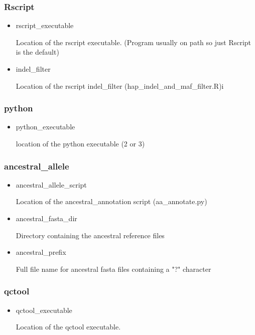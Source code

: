 \documentclass[a4paper,10pt]{article}
\begin{document}
\subsubsection{Rscript}
\begin{itemize}
\item rscript\_executable

Location of the rscript executable. (Program usually on path so just Rscript is the default)
\item indel\_filter

Location of the rscript indel\_filter (hap\_indel\_and\_maf\_filter.R)i
\end{itemize}
\subsubsection{python}
\begin{itemize}
\item python\_executable 

location of the python executable (2 or 3)
\end{itemize}
\subsubsection{ancestral\_allele}
\begin{itemize}
\item ancestral\_allele\_script

Location of the ancestral\_annotation script (aa\_annotate.py)
\item ancestral\_fasta\_dir 

Directory containing the ancestral reference files
\item ancestral\_prefix 

Full file name for ancestral fasta files containing a "?" character
\end{itemize}
\subsubsection{qctool}
\begin{itemize}
\item qctool\_executable

Location of the qctool executable.
\end{itemize}
\end{document}
